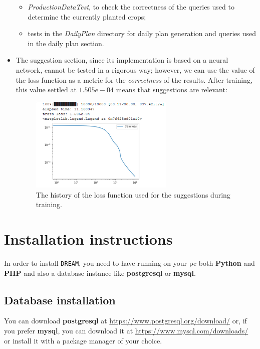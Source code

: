 \documentclass{article}
\begin{document}
\begin{itemize}
\begin{itemize}
        \item \textit{ProductionDataTest}, to check the correctness of the queries used to determine the currently planted crops;
        \item tests in the \textit{DailyPlan} directory for daily plan generation and queries used in the daily plan section.
    \end{itemize}
    \item The suggestion section, since its implementation is based on a neural network, cannot be tested in a rigorous way; however, we can use the value of the loss function as a metric for the \textit{correctness} of the results. After training, this value settled at $1.505e-04$ means that suggestions are relevant:
    \begin{figure}[H]
        \centering
        \includegraphics[width=0.65\textwidth]{loss_history_training.png}
        \caption{The history of the loss function used for the suggestions during training.}
        \label{fig:loss}
    \end{figure}
\end{itemize}
\newpage
\section{Installation instructions}
In order to install \verb|DREAM|, you need to have running on your pc both \textbf{Python} and \textbf{PHP} and also a database instance like \textbf{postgresql} or \textbf{mysql}.\\
\subsection{Database installation}
You can download \textbf{postgresql} at \url{https://www.postgresql.org/download/} or, if you prefer \textbf{mysql}, you can download it at \url{https://www.mysql.com/downloads/} or install it with a package manager of your choice.
\end{document}
